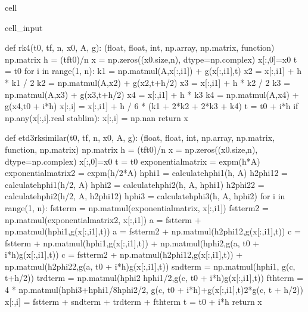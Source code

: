 \documentclass[letterpaper,10pt,english]{jupyterBook}
\begin{document}
\begin{sphinxuseclass}{cell}
\begin{sphinxVerbatimInput}
\begin{sphinxuseclass}{cell_input}
\begin{sphinxVerbatim}[commandchars=\\\{\}]
def rk4(t0, tf, n, x0, A, g):
    \PYGZsq{}\PYGZsq{}\PYGZsq{}(float, float, int, np.array, np.matrix, function) \PYGZhy{}\PYGZgt{} np.matrix\PYGZsq{}\PYGZsq{}\PYGZsq{}
    h = (tf\PYGZhy{}t0)/n
    x = np.zeros((x0.size,n), dtype=np.complex\PYGZus{})
    x[:,0]=x0
    t = t0
    for i in range(1, n):
        k1 = np.matmul(\PYGZhy{}A,x[:,i\PYGZhy{}1]) + g(x[:,i\PYGZhy{}1],t)
        x2 = x[:,i\PYGZhy{}1] + h * k1 / 2
        k2 = np.matmul(\PYGZhy{}A,x2) + g(x2,t+h/2)
        x3 = x[:,i\PYGZhy{}1] + h * k2 / 2
        k3 = np.matmul(\PYGZhy{}A,x3) + g(x3,t+h/2)
        x4 = x[:,i\PYGZhy{}1] + h * k3
        k4 = np.matmul(\PYGZhy{}A,x4) + g(x4,t0 + i*h)
        x[:,i] = x[:,i\PYGZhy{}1] + h / 6 * (k1 + 2*k2 + 2*k3 + k4)
        t = t0 + i*h
        if np.any(x[:,i].real \PYGZgt{} stab\PYGZus{}lim):
            x[:,i] = np.nan
    return x

def etd3rk\PYGZus{}similar(t0, tf, n, x0, A, g):
  \PYGZsq{}\PYGZsq{}\PYGZsq{}(float, float, int, np.array, np.matrix, function, np.matrix) \PYGZhy{}\PYGZgt{} np.matrix\PYGZsq{}\PYGZsq{}\PYGZsq{}
  h = (tf\PYGZhy{}t0)/n
  x = np.zeros((x0.size,n), dtype=np.complex\PYGZus{})
  x[:,0]=x0
  t = t0
  exponential\PYGZus{}matrix = expm(\PYGZhy{}h*A)
  exponential\PYGZus{}matrix\PYGZus{}2 = expm(\PYGZhy{}h/2*A)
  hphi1 = calculate\PYGZus{}hphi1(h, A)
  h\PYGZus{}2phi1\PYGZus{}2 = calculate\PYGZus{}hphi1(h/2, A)
  hphi2 = calculate\PYGZus{}hphi2(h, A, hphi1)
  h\PYGZus{}2phi2\PYGZus{}2 = calculate\PYGZus{}hphi2(h/2, A, h\PYGZus{}2phi1\PYGZus{}2)
  hphi3 = calculate\PYGZus{}hphi3(h, A, hphi2)
  for i in range(1, n):
    fst\PYGZus{}term = np.matmul(exponential\PYGZus{}matrix, x[:,i\PYGZhy{}1])
    fst\PYGZus{}term\PYGZus{}2 = np.matmul(exponential\PYGZus{}matrix\PYGZus{}2, x[:,i\PYGZhy{}1])
    a = fst\PYGZus{}term + np.matmul(hphi1,g(x[:,i\PYGZhy{}1],t))
    a\PYGZus{} = fst\PYGZus{}term\PYGZus{}2 + np.matmul(h\PYGZus{}2phi1\PYGZus{}2,g(x[:,i\PYGZhy{}1],t))
    c = fst\PYGZus{}term + np.matmul(hphi1,g(x[:,i\PYGZhy{}1],t)) + np.matmul(hphi2,g(a, t0 + i*h)\PYGZhy{}g(x[:,i\PYGZhy{}1],t))
    c\PYGZus{} = fst\PYGZus{}term\PYGZus{}2 + np.matmul(h\PYGZus{}2phi1\PYGZus{}2,g(x[:,i\PYGZhy{}1],t)) + np.matmul(h\PYGZus{}2phi2\PYGZus{}2,g(a\PYGZus{}, t0 + i*h)\PYGZhy{}g(x[:,i\PYGZhy{}1],t))
    snd\PYGZus{}term = np.matmul(hphi1, g(c\PYGZus{}, t+h/2))
    trd\PYGZus{}term = np.matmul(hphi2 \PYGZhy{} hphi1/2,g(c, t0 + i*h)\PYGZhy{}g(x[:,i\PYGZhy{}1],t))
    fth\PYGZus{}term = 4 * np.matmul(hphi3+hphi1/8\PYGZhy{}hphi2/2, g(c, t0 + i*h)+g(x[:,i\PYGZhy{}1],t)\PYGZhy{}2*g(c\PYGZus{}, t + h/2))
    x[:,i] = fst\PYGZus{}term + snd\PYGZus{}term + trd\PYGZus{}term + fth\PYGZus{}term
    t = t0 + i*h
  return x


\end{sphinxVerbatim}
\end{sphinxuseclass}
\end{sphinxVerbatimInput}
\end{sphinxuseclass}
\end{document}
